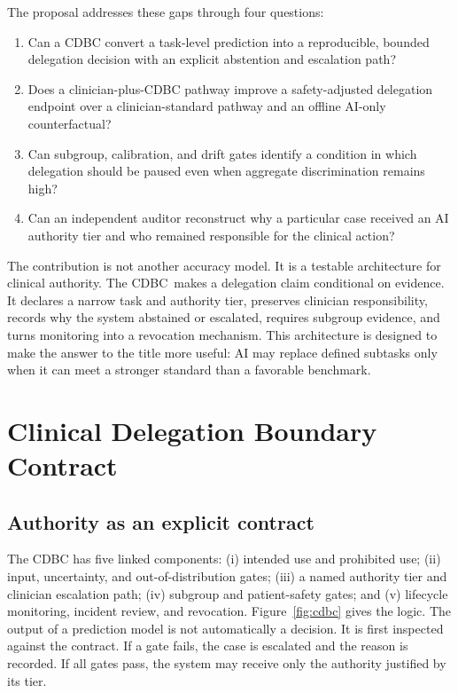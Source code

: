 \documentclass[conference]{IEEEtran}
\newcommand{\CDBC}{\textsc{CDBC}}
\begin{document}
The proposal addresses these gaps through four questions:
\begin{enumerate}
\item Can a CDBC convert a task-level prediction into a reproducible, bounded delegation decision with an explicit abstention and escalation path?
\item Does a clinician-plus-CDBC pathway improve a safety-adjusted delegation endpoint over a clinician-standard pathway and an offline AI-only counterfactual?
\item Can subgroup, calibration, and drift gates identify a condition in which delegation should be paused even when aggregate discrimination remains high?
\item Can an independent auditor reconstruct why a particular case received an AI authority tier and who remained responsible for the clinical action?
\end{enumerate}

The contribution is not another accuracy model. It is a testable architecture for clinical authority. The \CDBC\ makes a delegation claim conditional on evidence. It declares a narrow task and authority tier, preserves clinician responsibility, records why the system abstained or escalated, requires subgroup evidence, and turns monitoring into a revocation mechanism. This architecture is designed to make the answer to the title more useful: AI may replace defined subtasks only when it can meet a stronger standard than a favorable benchmark.

\section{Clinical Delegation Boundary Contract}

\subsection{Authority as an explicit contract}

The CDBC has five linked components: (i) intended use and prohibited use; (ii) input, uncertainty, and out-of-distribution gates; (iii) a named authority tier and clinician escalation path; (iv) subgroup and patient-safety gates; and (v) lifecycle monitoring, incident review, and revocation. Figure~\ref{fig:cdbc} gives the logic. The output of a prediction model is not automatically a decision. It is first inspected against the contract. If a gate fails, the case is escalated and the reason is recorded. If all gates pass, the system may receive only the authority justified by its tier.
\end{document}
